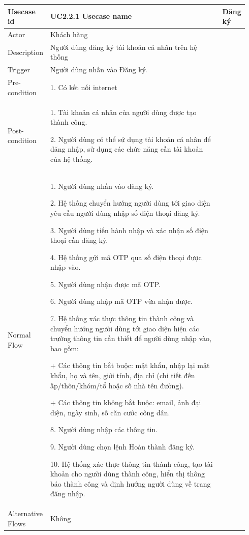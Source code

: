 \begin{longtable}{|>{\hspace{0pt}}m{0.15\linewidth}|>{\hspace{0pt}}m{0.79\linewidth}|} 
\hline
Usecase id & UC2.2.1 \endfirsthead 
\hline
Usecase name & Đăng ký \\ 
\hline
Actor & Khách hàng \\ 
\hline
Description & Người dùng đăng ký tài khoản cá nhân trên hệ thống \\ 
\hline
Trigger & Người dùng nhấn vào Đăng ký. \\ 
\hline
Pre-condition & 1. Có kết nối internet \\ 
\hline
Post-condition & 1. Tài khoản cá nhân của người dùng được tạo thành công.\par{}2. Người dùng có thể sử dụng tài khoản cá nhân để đăng nhập, sử dụng các chức năng cần tài khoản của hệ thống. \\ 
\hline
Normal Flow & 1. Người dùng nhấn vào đăng ký.\par{}2. Hệ thống chuyển hướng người dùng tới giao diện yêu cầu người dùng nhập số điện thoại đăng ký.\par{}3. Người dùng tiến hành nhập và xác nhận số điện thoại cần đăng ký.\par{}4. Hệ thống gửi mã OTP qua số điện thoại được nhập vào.~\par{}5. Người dùng nhận được mã OTP.\par{}6. Người dùng nhập mã OTP vừa nhận được.\par{}7. Hệ thống xác thực thông tin thành công và chuyển hướng người dùng tới giao diện hiện các trường thông tin cần thiết để người dùng nhập vào, bao gồm:~\par{}+ Các thông tin bắt buộc: mật khẩu, nhập lại mật khẩu, họ và tên, giới tính, địa chỉ (chi tiết đến ấp/thôn/khóm/tổ hoặc số nhà tên đường).\par{}+ Các thông tin không bắt buộc: email, ảnh đại diện, ngày sinh, số căn cước công dân.\par{}8. Người dùng nhập các thông tin.\par{}9. Người dùng chọn lệnh Hoàn thành đăng ký.\par{}10. Hệ thống xác thực thông tin thành công, tạo tài khoản cho người dùng thành công, hiển thị thông báo thành công và định hướng người dùng về trang đăng nhập. \\ 
\hline
Alternative Flows & Không \\ 
\hline

\end{longtable}
